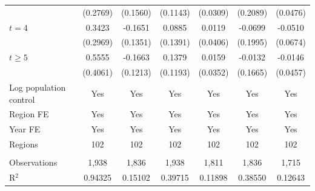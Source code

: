 \begin{tabular}{lcccccc}
                          & (0.2769)      & (0.1560)    & (0.1143)      & (0.0309)     & (0.2089)   & (0.0476)\\   
   $t = 4$                & 0.3423        & -0.1651     & 0.0885        & 0.0119       & -0.0699    & -0.0510\\   
                          & (0.2969)      & (0.1351)    & (0.1391)      & (0.0406)     & (0.1995)   & (0.0674)\\   
   $t \geq 5$             & 0.5555        & -0.1663     & 0.1379        & 0.0159       & -0.0132    & -0.0146\\   
                          & (0.4061)      & (0.1213)    & (0.1193)      & (0.0352)     & (0.1665)   & (0.0457)\\   
   Log population control & Yes           & Yes         & Yes           & Yes          & Yes        & Yes\\  
   Region FE              & Yes           & Yes         & Yes           & Yes          & Yes        & Yes\\  
   Year FE                & Yes           & Yes         & Yes           & Yes          & Yes        & Yes\\  
   Regions                & 102           & 102         & 102           & 102          & 102        & 102\\  
    \\
   Observations           & 1,938         & 1,836       & 1,938         & 1,811        & 1,836      & 1,715\\  
   R$^2$                  & 0.94325       & 0.15102     & 0.39715       & 0.11898      & 0.38550    & 0.12643\\  
   \bottomrule
\end{tabular}
\par\endgroup
